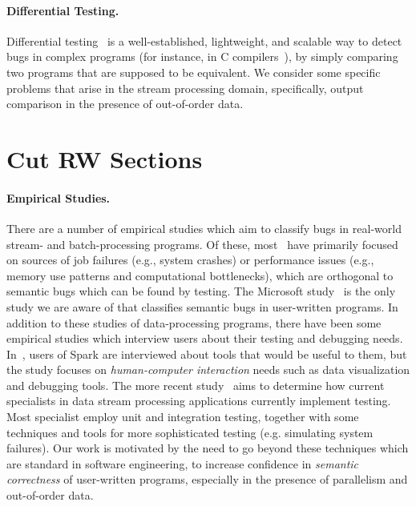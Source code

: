 \paragraph{Differential Testing.}
Differential testing~\cite{mckeeman1998differential,groce2007randomized} is a well-established, lightweight, and scalable way to detect bugs in complex programs (for instance, in C compilers~\cite{yang2011finding}), by simply comparing two programs that are supposed to be equivalent.  We consider some specific problems that arise in the stream processing domain, specifically, output comparison in the presence of out-of-order data.

\section{Cut RW Sections}



\paragraph{Empirical Studies.}
There are a number of empirical studies which aim to classify bugs in real-world stream- and batch-processing programs. Of these, most~\cite{schroeder2009large, kavulya2010analysis, li2013characteristic, zhou2015empirical} have primarily focused on sources of job failures (e.g., system crashes) or performance issues (e.g., memory use patterns and computational bottlenecks), which are orthogonal to semantic bugs which can be found by testing. The Microsoft study~\cite{xiao2014nondeterminism} is the only study we are aware of that classifies semantic bugs in user-written programs.
In addition to these studies of data-processing programs, there have been some empirical studies which interview users about their testing and debugging needs. In~\cite{fisher2012interactions}, users of Spark are interviewed about tools that would be useful to them, but the study focuses on \emph{human-computer interaction} needs such as data visualization and debugging tools. The more recent study~\cite{vianna2019exploratory} aims to determine how current specialists in data stream processing applications currently implement testing. Most specialist employ unit and integration testing, together with some techniques and tools for more sophisticated testing (e.g. simulating system failures). Our work is motivated by the need to go beyond these techniques which are standard in software engineering, to increase confidence in \emph{semantic correctness} of user-written programs, especially in the presence of parallelism and out-of-order data.

